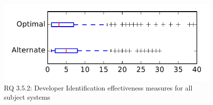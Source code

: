 
\begin{figure}
\centering
\includegraphics[height=0.4\textheight]{figures/combo/dit_rq2_tiny}
\caption{RQ 3.5.2: Developer Identification effectiveness measures for all subject systems}
\label{fig:dit:rq2:tiny}
\end{figure}
